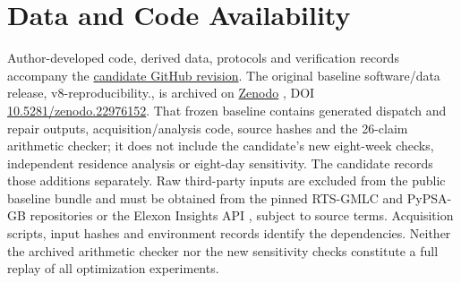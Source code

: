 \documentclass[journal]{IEEEtran}
\begin{document}
\section*{Data and Code Availability}
Author-developed code, derived data, protocols and verification records accompany the \href{https://github.com/shaikhamalkawi-ux/Decision-Stability-Certificates-for-Power-System-Operating-States-/tree/codex/v8r1-evidence}{candidate GitHub revision}. The original baseline software/data release, v8-reproducibility., is archived on \href{https://zenodo.org/records/22976152}{Zenodo} \cite{DSCGridArchive2026}, DOI \href{https://doi.org/10.5281/zenodo.22976152}{\mbox{10.5281/zenodo.22976152}}. That frozen baseline contains generated dispatch and repair outputs, acquisition/analysis code, source hashes and the 26-claim arithmetic checker; it does not include the candidate's new eight-week checks, independent residence analysis or eight-day sensitivity. The candidate records those additions separately. Raw third-party inputs are excluded from the public baseline bundle and must be obtained from the pinned RTS-GMLC and PyPSA-GB repositories or the Elexon Insights API \cite{ElexonInsights}, subject to source terms. Acquisition scripts, input hashes and environment records identify the dependencies. Neither the archived arithmetic checker nor the new sensitivity checks constitute a full replay of all optimization experiments.


\end{document}
